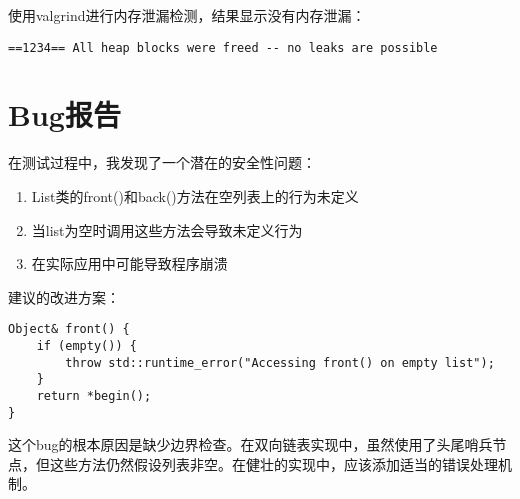 \documentclass[UTF8]{ctexart}
\begin{document}
使用valgrind进行内存泄漏检测，结果显示没有内存泄漏：
\begin{verbatim}
==1234== All heap blocks were freed -- no leaks are possible
\end{verbatim}

\section{Bug报告}

在测试过程中，我发现了一个潜在的安全性问题：

\begin{enumerate}
    \item List类的front()和back()方法在空列表上的行为未定义
    \item 当list为空时调用这些方法会导致未定义行为
    \item 在实际应用中可能导致程序崩溃
\end{enumerate}

建议的改进方案：

\begin{lstlisting}[caption=改进后的front()方法示例]
Object& front() {
    if (empty()) {
        throw std::runtime_error("Accessing front() on empty list");
    }
    return *begin();
}
\end{lstlisting}

这个bug的根本原因是缺少边界检查。在双向链表实现中，虽然使用了头尾哨兵节点，但这些方法仍然假设列表非空。在健壮的实现中，应该添加适当的错误处理机制。
\end{document}
